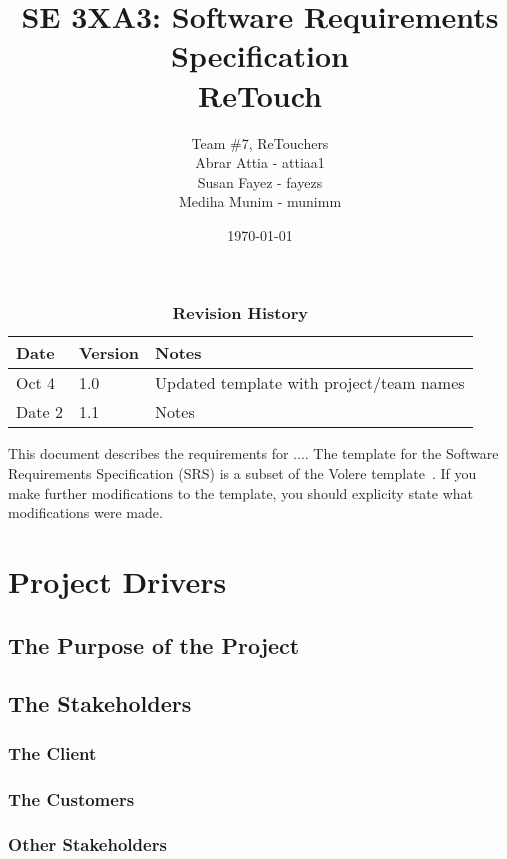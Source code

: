 \documentclass[12pt, titlepage]{article}
\title{SE 3XA3: Software Requirements Specification\\ReTouch}
\author{Team \#7, ReTouchers
		\\ Abrar Attia - attiaa1
		\\ Susan Fayez - fayezs
		\\ Mediha Munim - munimm
}
\date{\today}
\begin{document}
\maketitle

\tableofcontents
\listoftables
\listoffigures

\begin{table}[bp]
\caption{\bf Revision History}
\begin{tabularx}{\textwidth}{p{3cm}p{2cm}X}
\toprule {\bf Date} & {\bf Version} & {\bf Notes}\\
\midrule
Oct 4 & 1.0 & Updated template with project/team names\\
Date 2 & 1.1 & Notes\\
\bottomrule
\end{tabularx}
\end{table}

\newpage


This document describes the requirements for ....  The template for the Software
Requirements Specification (SRS) is a subset of the Volere
template~\citep{RobertsonAndRobertson2012}.  If you make further modifications
to the template, you should explicity state what modifications were made.

\section{Project Drivers}

\subsection{The Purpose of the Project}

\subsection{The Stakeholders}

\subsubsection{The Client}

\subsubsection{The Customers}

\subsubsection{Other Stakeholders}
\end{document}
